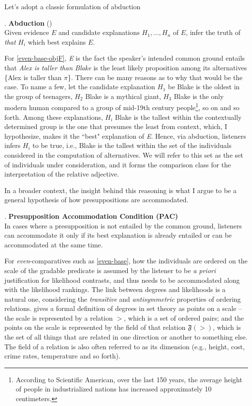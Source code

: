 \documentclass[12pt,letterpaper]{scrartcl}
\begin{document}
Let's adopt a classic formulation of abduction

\ex. \textbf{Abduction} (\cite{douven_abduction_2017}) \\ Given evidence $E$ and candidate explanations $H_1, ..., H_n$ of $E$, infer the truth of \textit{that} $H_i$ which best explains $E$.

For \ref{even-base-objF}, \textit{E} is the fact the speaker's intended common ground entails that \textit{Alex is taller than Blake} is the least likely proposition among its alternatives \{Alex is taller than $\pi$\}. There can be many reasons as to why that would be the case. To name a few, let the candidate explanation $H_1$ be Blake is the oldest in the group of teenagers, $H_2$ Blake is a mythical giant, $H_3$ Blake is the only modern human compared to a group of mid-19th century people\footnote{According to Scientific American, over the last 150 years, the average height of people in industrialized nations has increased approximately 10 centimeters.}, so on and so forth. Among these explanations, $H_i$ Blake is the tallest within the contextually determined group is the one that presumes the least from context, which, I hypothesize, makes it the ``best" explanation of \textit{E}. Hence, via abduction, listeners infers $H_i$ to be true, i.e., Blake is the tallest within the set of the individuals considered in the computation of alternatives. We will refer to this set as the set of individuals under consideration, and it forms the comparison class for the interpretation of the relative adjective.

In a broader context, the insight behind this reasoning is what I argue to be a general hypothesis of how presuppositions are accommodated.

\ex. \textbf{Presupposition Accommodation Condition (PAC)}\\
In cases where a presupposition is not entailed by the common ground, listeners can accommodate it only if its best explanation is already entailed or can be accommodated at the same time. %

For \textit{even}-comparatives such as \ref{even-base}, how the individuals are ordered on the scale of the gradable predicate is assumed by the listener to be \textit{a priori} justification for likelihood contrasts, and thus needs to be accommodated along with the likelihood rankings. The link between degrees and likelihoods is a natural one, considering the \textit{transitive} and \textit{antisymmetric} properties of ordering relations. \cite{cresswell_semantics_1976} gives a formal definition of degrees in set theory as points on a scale -- the scale is represented by a relation $>$, which is a set of ordered pairs; and the points on the scale is represented by the field of that relation $\mathfrak{F}(>)$, which is the set of all things that are related in one direction or another to something else. The field of a relation is also often referred to as its dimension (e.g., height, cost, crime rates, temperature and so forth).
\end{document}
